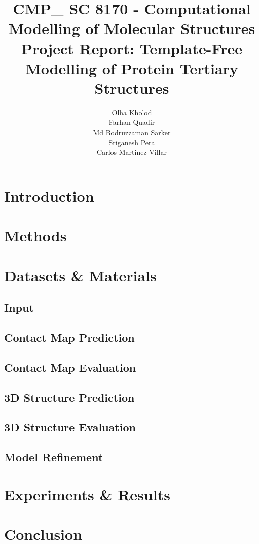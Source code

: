 \documentclass[11pt,titlepage]{article}
\author{Olha Kholod\\Farhan Quadir\\Md Bodruzzaman Sarker\\Sriganesh Pera\\Carlos Martinez Villar}
\title{CMP\_ SC 8170  - Computational Modelling of Molecular Structures\\Project Report: Template-Free Modelling of Protein Tertiary Structures}
\begin{document}
\maketitle
\section{Introduction}

\section{Methods}

\section{Datasets \& Materials}
\subsection{Input}
\subsection{Contact Map Prediction}
\subsection{Contact Map Evaluation}
\subsection{3D Structure Prediction}
\subsection{3D Structure Evaluation}
\subsection{Model Refinement}


\section{Experiments \& Results}

\section{Conclusion}
\end{document}
